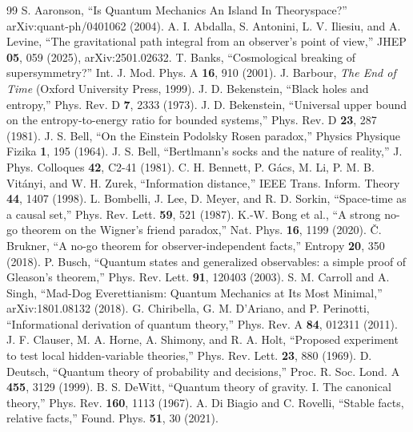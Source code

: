 \documentclass[11pt]{article}
\theoremstyle{definition}
\theoremstyle{remark}
\begin{document}
\begin{thebibliography}{99}\small
{} S. Aaronson, ``Is Quantum Mechanics An Island In Theoryspace?'' arXiv:quant-ph/0401062 (2004).
 A. I. Abdalla, S. Antonini, L. V. Iliesiu, and A. Levine, ``The gravitational path integral from an observer's point of view,'' JHEP \textbf{05}, 059 (2025), arXiv:2501.02632.
 T. Banks, ``Cosmological breaking of supersymmetry?'' Int. J. Mod. Phys. A \textbf{16}, 910 (2001).
 J. Barbour, \emph{The End of Time} (Oxford University Press, 1999).
 J. D. Bekenstein, ``Black holes and entropy,'' Phys. Rev. D \textbf{7}, 2333 (1973).
 J. D. Bekenstein, ``Universal upper bound on the entropy-to-energy ratio for bounded systems,'' Phys. Rev. D \textbf{23}, 287 (1981).
 J. S. Bell, ``On the Einstein Podolsky Rosen paradox,'' Physics Physique Fizika \textbf{1}, 195 (1964).
 J. S. Bell, ``Bertlmann's socks and the nature of reality,'' J. Phys. Colloques \textbf{42}, C2-41 (1981).
 C. H. Bennett, P. G\'acs, M. Li, P. M. B. Vit\'anyi, and W. H. Zurek, ``Information distance,'' IEEE Trans. Inform. Theory \textbf{44}, 1407 (1998).
 L. Bombelli, J. Lee, D. Meyer, and R. D. Sorkin, ``Space-time as a causal set,'' Phys. Rev. Lett. \textbf{59}, 521 (1987).
 K.-W. Bong et al., ``A strong no-go theorem on the Wigner's friend paradox,'' Nat. Phys. \textbf{16}, 1199 (2020).
 \v{C}. Brukner, ``A no-go theorem for observer-independent facts,'' Entropy \textbf{20}, 350 (2018).
 P. Busch, ``Quantum states and generalized observables: a simple proof of Gleason's theorem,'' Phys. Rev. Lett. \textbf{91}, 120403 (2003).
 S. M. Carroll and A. Singh, ``Mad-Dog Everettianism: Quantum Mechanics at Its Most Minimal,'' arXiv:1801.08132 (2018).
 G. Chiribella, G. M. D'Ariano, and P. Perinotti, ``Informational derivation of quantum theory,'' Phys. Rev. A \textbf{84}, 012311 (2011).
 J. F. Clauser, M. A. Horne, A. Shimony, and R. A. Holt, ``Proposed experiment to test local hidden-variable theories,'' Phys. Rev. Lett. \textbf{23}, 880 (1969).
 D. Deutsch, ``Quantum theory of probability and decisions,'' Proc. R. Soc. Lond. A \textbf{455}, 3129 (1999).
 B. S. DeWitt, ``Quantum theory of gravity. I. The canonical theory,'' Phys. Rev. \textbf{160}, 1113 (1967).
 A. Di Biagio and C. Rovelli, ``Stable facts, relative facts,'' Found. Phys. \textbf{51}, 30 (2021).

\end{thebibliography}
\end{document}
